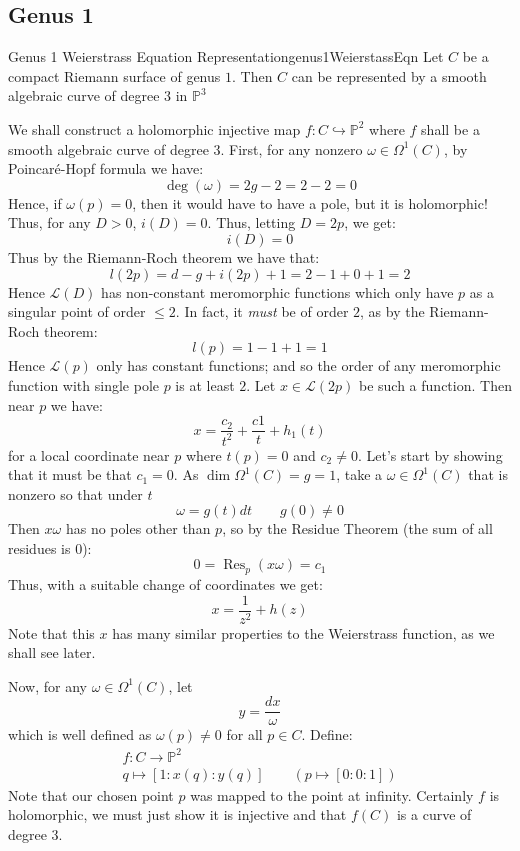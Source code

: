\documentclass{book}
\renewcommand{\P}{{\mathbb{P}}}
\newcommand{\CL}{{\mathcal{L}}}
\newcommand{\Res}{{\operatorname{Res}}}
\begin{document}
\subsection{Genus 1}

\begin{prop}{Genus 1 Weierstrass Equation Representation}{genus1WeierstassEqn}
   Let $C$ be a compact Riemann surface of genus $1$. Then $C$ can be represented by a smooth algebraic curve
   of degree $3$ in $\P^3$
\end{prop}

\begin{Proof}
  We shall construct a holomorphic injective map $f: C \hookrightarrow \P^2$ where $f$ shall be a smooth
  algebraic curve of degree $3$. First, for any nonzero $\omega \in \Omega^1(C)$, by Poincar\'e-Hopf formula
  we have:
  \[
    \deg(\omega) = 2g - 2 = 2-2= 0
  \]
  Hence, if $\omega(p) = 0$, then it would have to have a pole, but it is holomorphic! Thus, for any $D > 0$,
  $i(D) = 0$. Thus, letting $D = 2p$, we get:
  \[
    i(D) = 0
  \]
  Thus by the Riemann-Roch theorem we have that:
  \[
    l(2p) = d-g+i(2p) + 1 = 2-1+0+1 = 2
  \]
  Hence $\CL(D)$ has non-constant meromorphic functions which only have $p$ as a singular point of order $\le
  2$. In fact, it \emph{must} be of order $2$, as by the Riemann-Roch theorem:
  \[
    l(p) = 1-1+1=  1
  \]
  Hence $\CL(p)$ only has constant functions; and so the order of any meromorphic function with single pole $p$
  is at least $2$. Let $x \in \CL(2p)$ be such a function. Then near $p$ we have:
  \[
    x = \frac{c_2}{t^2} + \frac{c1}{t} + h_1(t)
  \]
  for a local coordinate near $p$ where $t(p) = 0$ and $c_2 \ne 0$. Let's start by showing that it must be
  that $c_1 = 0$. As $\dim \Omega^1(C) = g = 1$, take a $\omega \in \Omega^1(C)$ that is nonzero so that under
  $t$
  \[
    \omega = g(t)dt \qquad g(0) \ne 0
  \]
  Then $x\omega$ has no poles other than $p$, so by the Residue Theorem (the sum of all residues is $0$):
  \[
    0 = \Res_p(x\omega) = c_1
  \]
  Thus, with a suitable change of coordinates we get:
  \[
    x = \frac{1}{z^2} + h(z)
  \]
  Note that this $x$ has many similar properties to the Weierstrass function, as we shall see later.

  Now, for any $\omega \in \Omega^1(C)$, let
  \[
    y = \frac{dx}{\omega}
  \]
  which is well defined as $\omega(p) \ne 0$ for all $p \in C$. Define:
  \begin{gather*}
    f: C \to \P^2 \\
    q \mapsto [1: x(q): y(q)] \qquad (p \mapsto [0:0:1])
  \end{gather*}
  Note that our chosen point $p$ was mapped to the point at infinity. Certainly $f$ is holomorphic, we must just show it is injective and that $f(C)$ is a curve of degree $3$.


\end{Proof}
\end{document}
